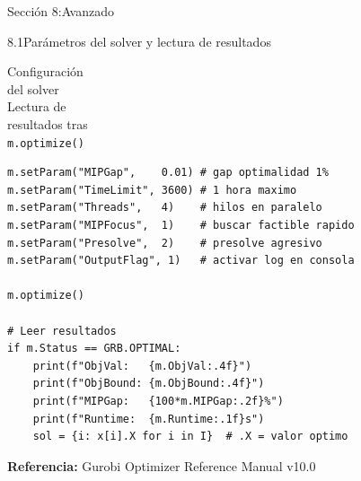 \documentclass[10pt,a4paper]{article}
\newlength{\mathcolw}
\newlength{\codecolw}
\newcommand{\secheader}[2]{%
  \vspace{10pt}%
  \needspace{6cm}%
  \noindent%
  \begin{tcolorbox}[
    colback=sectionbg, colupper=white,
    colframe=sectionbg, sharp corners,
    left=8pt, right=8pt, top=5pt, bottom=5pt,
    fontupper=\large\bfseries\sffamily,
  ]
  Secci\'on #1:\enspace #2
  \end{tcolorbox}%
  \vspace{2pt}%
}
\newcommand{\entryheader}[1]{%
  \needspace{5cm}%
  \vspace{6pt}%
  \noindent%
  \begin{tcolorbox}[
    colback=subsecbg!18,
    colframe=subsecbg!45,
    sharp corners, boxrule=0.4pt,
    left=5pt, right=5pt, top=2pt, bottom=2pt,
    fontupper=\small\bfseries\sffamily,
  ]
  #1
  \end{tcolorbox}%
  \vspace{2pt}%
}
\newcommand{\py}[1]{\texttt{\small #1}}
\begin{document}
\vspace{4pt}

\secheader{8}{Avanzado}

\entryheader{8.1\quad Par\'ametros del solver y lectura de resultados}
\noindent
\begin{minipage}[t]{\mathcolw}
    \begin{tcolorbox}[mathbox]
        Configuraci\'on\\ del solver\\[4pt]
        Lectura de\\resultados tras\\ \py{m.optimize()}
    \end{tcolorbox}
\end{minipage}\hspace{0.02\textwidth}%
\begin{minipage}[t]{\codecolw}
    \begin{lstlisting}[style=gurobipy]
m.setParam("MIPGap",    0.01) # gap optimalidad 1%
m.setParam("TimeLimit", 3600) # 1 hora maximo
m.setParam("Threads",   4)    # hilos en paralelo
m.setParam("MIPFocus",  1)    # buscar factible rapido
m.setParam("Presolve",  2)    # presolve agresivo
m.setParam("OutputFlag", 1)   # activar log en consola

m.optimize()

# Leer resultados
if m.Status == GRB.OPTIMAL:
    print(f"ObjVal:   {m.ObjVal:.4f}")
    print(f"ObjBound: {m.ObjBound:.4f}")
    print(f"MIPGap:   {100*m.MIPGap:.2f}%")
    print(f"Runtime:  {m.Runtime:.1f}s")
    sol = {i: x[i].X for i in I}  # .X = valor optimo
\end{lstlisting}
\end{minipage}

\vspace{14pt}

\begin{tcolorbox}[
        colback=sectionbg!8, colframe=sectionbg!30,
        sharp corners, boxrule=0.4pt,
        left=8pt, right=8pt, top=4pt, bottom=4pt,
    ]
    \footnotesize
    \textbf{Referencia:} Gurobi Optimizer Reference Manual v10.0\enspace
\end{tcolorbox}
\end{document}
